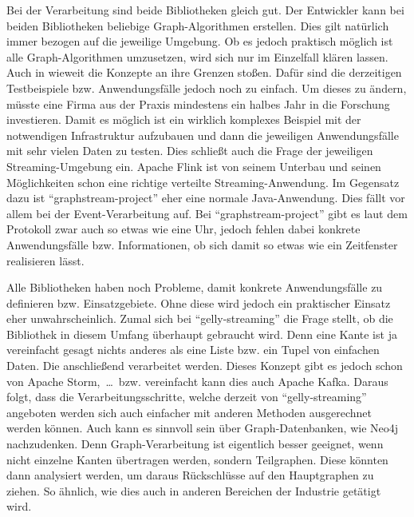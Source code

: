 Bei der Verarbeitung sind beide Bibliotheken gleich gut. Der Entwickler kann bei
beiden Bibliotheken beliebige Graph-Algorithmen erstellen. Dies gilt natürlich
immer bezogen auf die jeweilige Umgebung. Ob es jedoch praktisch möglich ist
alle Graph-Algorithmen umzusetzen, wird sich nur im Einzelfall klären lassen.
Auch in wieweit die Konzepte an ihre Grenzen stoßen. Dafür sind die derzeitigen
Testbeispiele bzw. Anwendungsfälle jedoch noch zu einfach. Um dieses zu ändern,
müsste eine Firma aus der Praxis mindestens ein halbes Jahr in die Forschung
investieren. Damit es möglich ist ein wirklich komplexes Beispiel mit der
notwendigen Infrastruktur aufzubauen und dann die jeweiligen Anwendungsfälle
mit sehr vielen Daten zu testen. Dies schließt auch die Frage der jeweiligen
Streaming-Umgebung ein. Apache Flink ist von seinem Unterbau und seinen
Möglichkeiten schon eine richtige verteilte Streaming-Anwendung. Im Gegensatz
dazu ist \enquote{graphstream-project} eher eine normale Java-Anwendung. Dies
fällt vor allem bei der Event-Verarbeitung auf. Bei \enquote{graphstream-project}
gibt es laut dem Protokoll zwar auch so etwas wie eine Uhr, jedoch fehlen dabei
konkrete Anwendungsfälle bzw. Informationen, ob sich damit so etwas wie ein
Zeitfenster realisieren lässt.

Alle Bibliotheken haben noch Probleme, damit konkrete Anwendungsfälle zu
definieren bzw. Einsatzgebiete. Ohne diese wird jedoch ein praktischer Einsatz
eher unwahrscheinlich. Zumal sich bei \enquote{gelly-streaming} die Frage stellt,
ob die Bibliothek in diesem Umfang überhaupt gebraucht wird. Denn eine Kante
ist ja vereinfacht gesagt nichts anderes als eine Liste bzw. ein Tupel von
einfachen Daten. Die anschließend verarbeitet werden. Dieses Konzept gibt es
jedoch schon von Apache Storm,~\dots~bzw. vereinfacht kann dies auch Apache Kafka.
Daraus folgt, dass die Verarbeitungsschritte, welche derzeit von
\enquote{gelly-streaming} angeboten werden sich auch einfacher mit anderen
Methoden ausgerechnet werden können. Auch kann es sinnvoll sein über
Graph-Datenbanken, wie Neo4j nachzudenken. Denn Graph-Verarbeitung ist eigentlich
besser geeignet, wenn nicht einzelne Kanten übertragen werden, sondern
Teilgraphen. Diese könnten dann analysiert werden, um daraus Rückschlüsse auf
den Hauptgraphen zu ziehen. So ähnlich, wie dies auch in anderen Bereichen
der Industrie getätigt wird.

